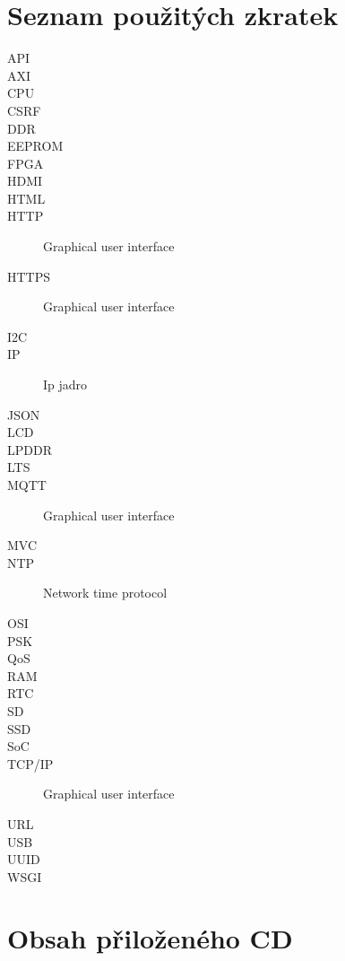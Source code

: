 \documentclass[thesis=M,czech]{templates/FITthesis}[2012/06/26]
\begin{document}
\chapter{Seznam použitých zkratek}
\begin{description}
	\item[API]
    \item[AXI]
    \item[CPU]
    \item[CSRF]
    \item[DDR]
    \item[EEPROM]
    \item[FPGA]
    \item[HDMI]
    \item[HTML]
	\item[HTTP] Graphical user interface
    \item[HTTPS] Graphical user interface
    \item[I2C]
    \item[IP] Ip jadro
    \item[JSON]
    \item[LCD]
    \item[LPDDR]
    \item[LTS]
    \item[MQTT] Graphical user interface
    \item[MVC]
    \item[NTP] Network time protocol
    \item[OSI]
    \item[PSK]
    \item[QoS]
    \item[RAM]
    \item[RTC]
    \item[SD]
    \item[SSD]
    \item[SoC]
    \item[TCP/IP] Graphical user interface
    \item[URL]
    \item[USB]
    \item[UUID]
    \item[WSGI]
\end{description}

\chapter{Obsah přiloženého CD}

\begin{figure}
\end{figure}
\end{document}
